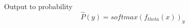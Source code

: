 \documentclass[preview]{standalone}
\begin{document}
\begin{center}
Output to probability $$\hat{P}(y) = softmax(f_{theta}(x))_y$$
\end{center}
\end{document}
